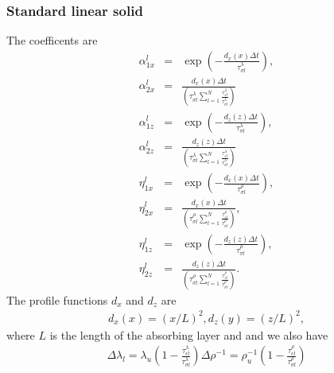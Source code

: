 \documentclass[11pt]{article}
\begin{document}
\subsubsection*{Standard linear solid}
The coefficents are
\begin{eqnarray*}
\alpha^l_{1x}  & = & \exp\left(-\frac{d_x(x)\Delta t}
                          {\tau^{\lambda}_{\sigma l}}\right),        \\
\alpha^l_{2x}  & = & \frac{d_x(x)\Delta t}
                  {(\tau^{\lambda}_{\sigma l}
                   \sum_{l=1}^N \frac{\tau^{\lambda}_{\epsilon l}}
                                     {\tau^{\lambda}_{\sigma l}  })
                  }                                                  \\
\alpha^l_{1z}  & = & \exp\left(-\frac{d_z(z)\Delta t}
                          {\tau^{\lambda}_{\sigma l}}\right),        \\
\alpha^l_{2z}  & = & \frac{d_z(z)\Delta t}
                  {(\tau^{\lambda}_{\sigma l}
                   \sum_{l=1}^N \frac{\tau^{\lambda}_{\epsilon l}}
                                     {\tau^{\lambda}_{\sigma l}  })
                  }                                                  \\
\eta^l_{1x}  & = & \exp\left(-\frac{d_x(x)\Delta t}
                          {\tau^{\rho}_{\sigma l}}\right),           \\
\eta^l_{2x}  & = & \frac{d_x(x)\Delta t}
                  {(\tau^{\rho}_{\sigma l}
                   \sum_{l=1}^N \frac{\tau^{\rho}_{\epsilon l}}
                                     {\tau^{\rho}_{\sigma l}  })
                  },                                                 \\
\eta^l_{1z}  & = & \exp\left(-\frac{d_z(z)\Delta t}
                          {\tau^{\rho}_{\sigma l}}\right),           \\
\eta^l_{2z}  & = & \frac{d_z(z)\Delta t}
                  {(\tau^{\rho}_{\sigma l}
                   \sum_{l=1}^N \frac{\tau^{\rho}_{\epsilon l}}
                                     {\tau^{\rho}_{\sigma l}  })
                  }.
\end{eqnarray*}
The profile functions $d_x$ and $d_z$ are
\begin{eqnarray*}
  d_x(x) = (x/L)^2,
  d_z(y) = (z/L)^2,
\end{eqnarray*}
where $L$ is the length of the absorbing layer and 
and we also have
\begin{eqnarray}
\Delta \lambda_l = \lambda_u\left(1-\frac{\tau^{\lambda}_{\epsilon l}}{\tau^{\lambda}_{\sigma l}}\right)
\Delta \rho^{-1} = \rho^{-1}_u\left(1-\frac{\tau^{\rho}_{\epsilon l}}{\tau^{\rho}_{\sigma l}}\right)
\end{eqnarray}
\end{document}
